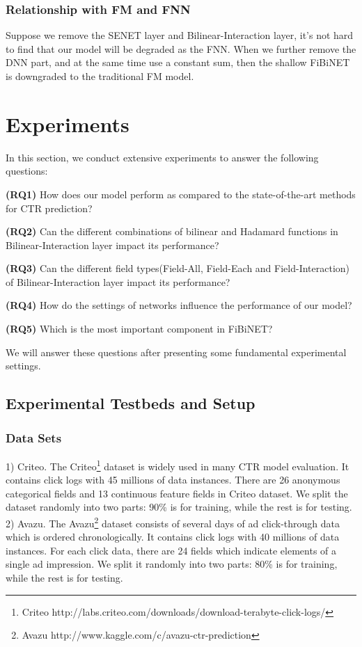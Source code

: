 \documentclass[sigconf]{acmart}
\begin{document}
\subsubsection{Relationship with FM and FNN} Suppose we remove the SENET layer and Bilinear-Interaction layer, it's not hard to find that our model will be degraded as the FNN. When we further remove the DNN part, and at the same time use a constant sum, then the shallow FiBiNET is downgraded to the traditional FM model.
\section{Experiments}
\label{sec:s4}
In this section, we conduct extensive experiments to answer the
following questions:

\noindent\textbf{(RQ1)} How does our model perform as compared to the
state-of-the-art methods for CTR prediction?

\noindent\textbf{(RQ2)} Can the different combinations of bilinear and Hadamard functions in Bilinear-Interaction layer impact its performance?

\noindent\textbf{(RQ3)} Can the different field types(Field-All, Field-Each and Field-Interaction) of Bilinear-Interaction layer impact its
performance?

\noindent\textbf{(RQ4)} How do the settings of networks influence the performance
of our model?

\noindent\textbf{(RQ5)} Which is the most important component in FiBiNET?


We will answer these questions after presenting some fundamental
experimental settings.
\subsection{Experimental Testbeds and Setup}
\subsubsection{Data Sets} 1) Criteo.
The Criteo\footnote{Criteo
  http://labs.criteo.com/downloads/download-terabyte-click-logs/}
dataset is widely used in many CTR model evaluation. It contains click
logs with 45 millions of data instances. There are 26 anonymous
categorical fields and 13 continuous feature fields in Criteo dataset.
We split the dataset randomly into two parts: 90\% is for training,
while the rest is for testing. 2) Avazu. The Avazu\footnote{Avazu http://www.kaggle.com/c/avazu-ctr-prediction}
dataset consists of several days of ad click-through data which is
ordered chronologically. It contains click logs with 40 millions of data
instances. For each click data, there are 24 fields which indicate
elements of a single ad impression. We split it randomly into two parts:
80\% is for training, while the rest is for testing.
\end{document}
